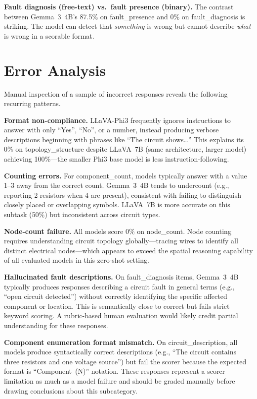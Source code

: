 \documentclass[conference]{IEEEtran}
\begin{document}
\textbf{Fault diagnosis (free-text) vs.\ fault presence (binary).}
The contrast between Gemma~3~4B's 87.5\% on fault\_presence and
0\% on fault\_diagnosis is striking.
The model can detect that \emph{something} is wrong but cannot describe
\emph{what} is wrong in a scorable format.


\section{Error Analysis}
\label{sec:error}

Manual inspection of a sample of incorrect responses reveals the
following recurring patterns.

\textbf{Format non-compliance.}
LLaVA-Phi3 frequently ignores instructions to answer with only
``Yes'', ``No'', or a number, instead producing verbose descriptions
beginning with phrases like ``The circuit shows\ldots''
This explains its 0\% on topology\_structure despite LLaVA~7B (same
architecture, larger model) achieving 100\%---the smaller Phi3 base
model is less instruction-following.

\textbf{Counting errors.}
For component\_count, models typically answer with a value 1--3 away
from the correct count.
Gemma~3~4B tends to undercount (e.g., reporting 2 resistors when 4
are present), consistent with failing to distinguish closely placed
or overlapping symbols.
LLaVA~7B is more accurate on this subtask (50\%) but inconsistent
across circuit types.

\textbf{Node-count failure.}
All models score 0\% on node\_count.
Node counting requires understanding circuit topology globally---tracing
wires to identify all distinct electrical nodes---which appears to
exceed the spatial reasoning capability of all evaluated models in
this zero-shot setting.

\textbf{Hallucinated fault descriptions.}
On fault\_diagnosis items, Gemma~3~4B typically produces responses
describing a circuit fault in general terms (e.g., ``open circuit
detected'') without correctly identifying the specific affected
component or location.
This is semantically close to correct but fails strict keyword scoring.
A rubric-based human evaluation would likely credit partial understanding
for these responses.

\textbf{Component enumeration format mismatch.}
On circuit\_description, all models produce syntactically correct
descriptions (e.g., ``The circuit contains three resistors and one
voltage source'') but fail the scorer because the expected format
is ``Component~(N)'' notation.
These responses represent a scorer limitation as much as a model
failure and should be graded manually before drawing conclusions about
this subcategory.
\end{document}
